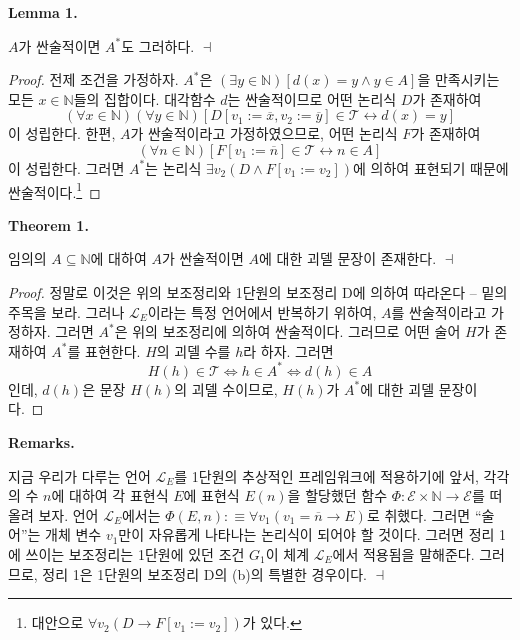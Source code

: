 \documentclass[12pt]{paper}
\newenvironment{context}[1][]
{ \noindent \textbf{{#1}.}
}
{ \hfill $ \dashv $
}
\begin{document}
\begin{context}[Lemma 1]
$A$가 싼술적이면 $A^{*}$도 그러하다.
\end{context}

\begin{proof}
전제 조건을 가정하자.
$A^{*}$은 $\left( \exists y \in \mathbb{N} \right) \left[ d \left( x \right) = y \land y \in A \right]$을 만족시키는 모든 $x \in \mathbb{N}$들의 집합이다.
대각함수 $d$는 싼술적이므로 어떤 논리식 $D$가 존재하여 $$ \left( \forall x \in \mathbb{N} \right) \left( \forall y \in \mathbb{N} \right) \left[ D \left[ v_1 := \overline{x} , v_2 := \overline{y} \right] \in \mathcal{T} \leftrightarrow d \left( x \right) = y \right] $$이 성립한다.
한편, $A$가 싼술적이라고 가정하였으므로, 어떤 논리식 $F$가 존재하여 $$ \left( \forall n \in \mathbb{N} \right) \left[ F \left[ v_1 := \overline{n} \right] \in \mathcal{T} \leftrightarrow n \in A \right]$$이 성립한다.
그러면 $A^{*}$는 논리식 $\exists v_2 \left( D \land F \left[ v_1 := v_2 \right] \right)$에 의하여 표현되기 때문에 싼술적이다.\footnote
{
대안으로 $\forall v_2 \left( D \rightarrow F \left[ v_1 := v_2 \right] \right)$가 있다.
}
\end{proof}

\begin{context}[Theorem 1]
임의의 $A \subseteq \mathbb{N}$에 대하여 $A$가 싼술적이면 $A$에 대한 괴델 문장이 존재한다.
\end{context}

\begin{proof}
정말로 이것은 위의 보조정리와 1단원의 보조정리 D에 의하여 따라온다 -- 밑의 주목을 보라.
그러나 $\mathcal{L}_{E}$이라는 특정 언어에서 반복하기 위하여, $A$를 싼술적이라고 가정하자.
그러면 $A^{*}$은 위의 보조정리에 의하여 싼술적이다.
그러므로 어떤 술어 $H$가 존재하여 $A^{*}$를 표현한다.
$H$의 괴델 수를 $h$라 하자.
그러면 $$H \left( h \right) \in \mathcal{T} \iff h \in A^{*} \iff d \left( h \right) \in A$$인데,
$d \left( h \right)$은 문장 $H \left( h \right)$의 괴델 수이므로,
$H \left( h \right)$가 $A^{*}$에 대한 괴델 문장이다.
\end{proof}

\begin{context}[Remarks]
지금 우리가 다루는 언어 $\mathcal{L}_{E}$를 1단원의 추상적인 프레임워크에 적용하기에 앞서,
각각의 수 $n$에 대하여 각 표현식 $E$에 표현식 $E \left( n \right)$을 할당했던 함수 $\Phi : \mathcal{E} \times \mathbb{N} \to \mathcal{E}$를 떠올려 보자.
언어 $\mathcal{L}_{E}$에서는 $\Phi \left( E , n \right) : \equiv \forall v_1 \left( v_1 = \overline{n} \rightarrow E \right)$로 취했다.
그러면 ``술어''는 개체 변수 $v_1$만이 자유롭게 나타나는 논리식이 되어야 할 것이다.
그러면 정리 1에 쓰이는 보조정리는 1단원에 있던 조건 $G_1$이 체계 $\mathcal{L}_{E}$에서 적용됨을 말해준다.
그러므로, 정리 1은 1단원의 보조정리 D의 (b)의 특별한 경우이다.
\end{context}
\end{document}

